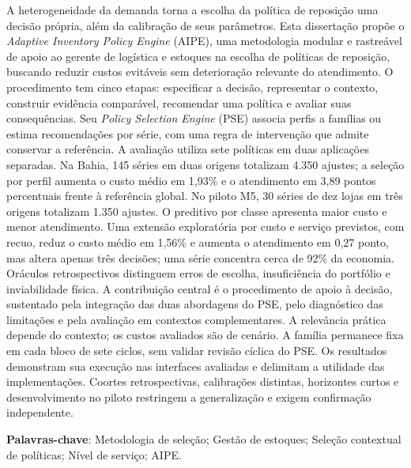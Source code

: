A heterogeneidade da demanda torna a escolha da política de reposição uma decisão própria, além da calibração de seus parâmetros. Esta dissertação propõe o \textit{Adaptive Inventory Policy Engine} (AIPE), uma metodologia modular e rastreável de apoio ao gerente de logística e estoques na escolha de políticas de reposição, buscando reduzir custos evitáveis sem deterioração relevante do atendimento. O procedimento tem cinco etapas: especificar a decisão, representar o contexto, construir evidência comparável, recomendar uma política e avaliar suas consequências. Seu \textit{Policy Selection Engine} (PSE) associa perfis a famílias ou estima recomendações por série, com uma regra de intervenção que admite conservar a referência. A avaliação utiliza sete políticas em duas aplicações separadas. Na Bahia, 145 séries em duas origens totalizam 4.350 ajustes; a seleção por perfil aumenta o custo médio em 1,93\% e o atendimento em 3,89 pontos percentuais frente à referência global. No piloto M5, 30 séries de dez lojas em três origens totalizam 1.350 ajustes. O preditivo por classe apresenta maior custo e menor atendimento. Uma extensão exploratória por custo e serviço previstos, com recuo, reduz o custo médio em 1,56\% e aumenta o atendimento em 0,27 ponto, mas altera apenas três decisões; uma série concentra cerca de 92\% da economia. Oráculos retrospectivos distinguem erros de escolha, insuficiência do portfólio e inviabilidade física. A contribuição central é o procedimento de apoio à decisão, sustentado pela integração das duas abordagens do PSE, pelo diagnóstico das limitações e pela avaliação em contextos complementares. A relevância prática depende do contexto; os custos avaliados são de cenário. A família permanece fixa em cada bloco de sete ciclos, sem validar revisão cíclica do PSE. Os resultados demonstram sua execução nas interfaces avaliadas e delimitam a utilidade das implementações. Coortes retrospectivas, calibrações distintas, horizontes curtos e desenvolvimento no piloto restringem a generalização e exigem confirmação independente.

\vspace{2em}
\textbf{Palavras-chave}: Metodologia de seleção; Gestão de estoques; Seleção contextual de políticas; Nível de serviço; AIPE.
